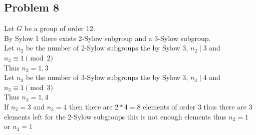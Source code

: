\documentclass[12pt, letterpaper]{article}
\theoremstyle{definition}
\begin{document}
\newpage
\subsection*{Problem 8}
Let $G$ be a group of order 12.\\
By Sylow 1 there exists 2-Sylow subgroup and a 3-Sylow subgroup.\\
Let $n_2$ be the number of 2-Sylow subgroups the by Sylow 3, $n_2 \mid 3$ and $n_2 \equiv 1 \pmod{2}$\\
Thus $n_2=1,3$\\
Let $n_3$ be the number of 3-Sylow subgroups the by Sylow 3, $n_3 \mid 4$ and $n_3 \equiv 1 \pmod{3}$\\
Thus $n_3=1,4$\\
If $n_2=3$ and $n_3=4$ then there are $2*4=8$ elements of order 3 thus there are 3 elements left for the 2-Sylow subgroups
this is not enough elements thus $n_2=1$ or $n_3=1$\\
\end{document}
